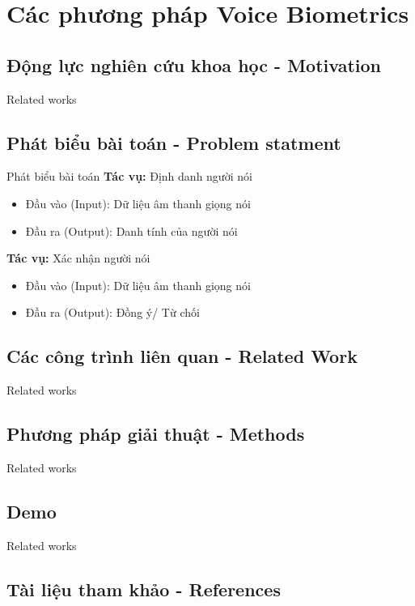 \documentclass[11pt]{beamer}
\begin{document}
\section{Các phương pháp Voice Biometrics}
\subsection{Động lực nghiên cứu khoa học - Motivation}
\begin{frame}{Related works}
\end{frame}
\subsection{Phát biểu bài toán - Problem statment}
\begin{frame}{Phát biểu bài toán}
	\textbf{Tác vụ:} Định danh người nói
	\begin{itemize}
		\item Đầu vào (Input): Dữ liệu âm thanh giọng nói
		\item Đầu ra (Output): Danh tính của người nói
	\end{itemize}
	\textbf{Tác vụ:} Xác nhận người nói
	\begin{itemize}
		\item Đầu vào (Input): Dữ liệu âm thanh giọng nói
		\item Đầu ra (Output): Đồng ý/ Từ chối
	\end{itemize}
\end{frame}
\subsection{Các công trình liên quan - Related Work}
\begin{frame}{Related works}
	
\end{frame}
\subsection{Phương pháp giải thuật - Methods}
\begin{frame}{Related works}
\end{frame}
\subsection{Demo}
\begin{frame}{Related works}
\end{frame}
\subsection{Tài liệu tham khảo - References}
\begin{frame}
	\nocite{*}
	\newpage\cleardoublepage
	
\end{frame}
\end{document}
